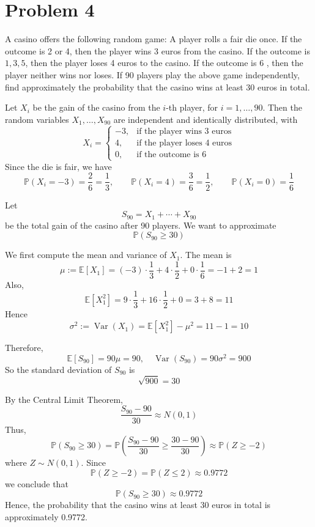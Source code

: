 \section*{Problem 4}
A casino offers the following random game: 
A player rolls a fair die once. 
If the outcome is 2 or 4, then the player wins 3 euros from the casino. 
If the outcome is $1,3,5$, then the player loses 4 euros to the casino.
If the outcome is 6 , then the player neither wins nor loses.
If 90 players play the above game independently, 
find approximately the probability that the casino wins 
at least 30 euros in total.
\begin{solution}
Let $X_i$ be the gain of the casino from the $i$-th player, for $i=1,\dots,90$. Then the random variables
$X_1,\dots,X_{90}$ are independent and identically distributed, with
\[
X_i=
\begin{cases}
-3, & \text{if the player wins 3 euros}\\
4, & \text{if the player loses 4 euros}\\
0, & \text{if the outcome is 6}
\end{cases}
\]
Since the die is fair, we have
\[
\mathbb{P}(X_i=-3)=\frac{2}{6}=\frac13,\qquad
\mathbb{P}(X_i=4)=\frac{3}{6}=\frac12,\qquad
\mathbb{P}(X_i=0)=\frac{1}{6}
\]

Let
\[
S_{90}=X_1+\cdots+X_{90}
\]
be the total gain of the casino after 90 players. We want to approximate
\[
\mathbb{P}(S_{90}\ge 30)
\]

We first compute the mean and variance of $X_1$. The mean is
\[
\mu:=\mathbb{E}[X_1]
=(-3)\cdot \frac13+4\cdot \frac12+0\cdot \frac16
=-1+2=1
\]
Also,
\[
\mathbb{E}[X_1^2]
=9\cdot \frac13+16\cdot \frac12+0
=3+8=11
\]
Hence
\[
\sigma^2:=\operatorname{Var}(X_1)=\mathbb{E}[X_1^2]-\mu^2=11-1=10
\]

Therefore,
\[
\mathbb{E}[S_{90}]=90\mu=90,
\quad
\operatorname{Var}(S_{90})=90\sigma^2=900
\]
So the standard deviation of $S_{90}$ is
\[
\sqrt{900}=30
\]

By the Central Limit Theorem,
\[
\frac{S_{90}-90}{30}\approx N(0,1)
\]
Thus,
\[
\mathbb{P}(S_{90}\ge 30)
=
\mathbb{P}\left(\frac{S_{90}-90}{30}\ge \frac{30-90}{30}\right)
\approx
\mathbb{P}(Z\ge -2)
\]
where $Z\sim N(0,1)$. Since
\[
\mathbb{P}(Z\ge -2)=\mathbb{P}(Z\le 2)\approx 0.9772
\]
we conclude that
\[
\mathbb{P}(S_{90}\ge 30)\approx 0.9772
\]
Hence, the probability that the casino wins at least 30 euros in total is 
approximately 0.9772.
\end{solution}


